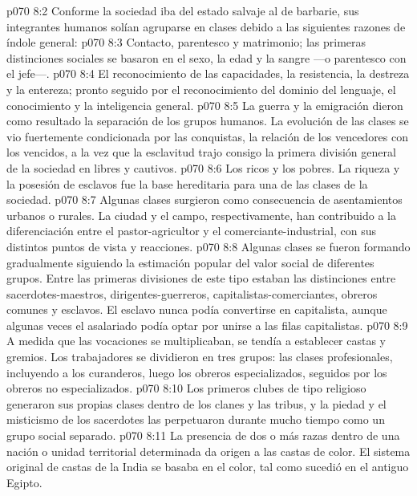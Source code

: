 \vs p070 8:2 Conforme la sociedad iba del estado salvaje al de barbarie, sus integrantes humanos solían agruparse en clases debido a las siguientes razones de índole general:
\vs p070 8:3  Contacto, parentesco y matrimonio; las primeras distinciones sociales se basaron en el sexo, la edad y la sangre ---o parentesco con el jefe---.
\vs p070 8:4  El reconocimiento de las capacidades, la resistencia, la destreza y la entereza; pronto seguido por el reconocimiento del dominio del lenguaje, el conocimiento y la inteligencia general.
\vs p070 8:5  La guerra y la emigración dieron como resultado la separación de los grupos humanos. La evolución de las clases se vio fuertemente condicionada por las conquistas, la relación de los vencedores con los vencidos, a la vez que la esclavitud trajo consigo la primera división general de la sociedad en libres y cautivos.
\vs p070 8:6  Los ricos y los pobres. La riqueza y la posesión de esclavos fue la base hereditaria para una de las clases de la sociedad.
\vs p070 8:7  Algunas clases surgieron como consecuencia de asentamientos urbanos o rurales. La ciudad y el campo, respectivamente, han contribuido a la diferenciación entre el pastor\hyp{}agricultor y el comerciante\hyp{}industrial, con sus distintos puntos de vista y reacciones.
\vs p070 8:8  Algunas clases se fueron formando gradualmente siguiendo la estimación popular del valor social de diferentes grupos. Entre las primeras divisiones de este tipo estaban las distinciones entre sacerdotes\hyp{}maestros, dirigentes\hyp{}guerreros, capitalistas\hyp{}comerciantes, obreros comunes y esclavos. El esclavo nunca podía convertirse en capitalista, aunque algunas veces el asalariado podía optar por unirse a las filas capitalistas.
\vs p070 8:9  A medida que las vocaciones se multiplicaban, se tendía a establecer castas y gremios. Los trabajadores se dividieron en tres grupos: las clases profesionales, incluyendo a los curanderos, luego los obreros especializados, seguidos por los obreros no especializados.
\vs p070 8:10  Los primeros clubes de tipo religioso generaron sus propias clases dentro de los clanes y las tribus, y la piedad y el misticismo de los sacerdotes las perpetuaron durante mucho tiempo como un grupo social separado.
\vs p070 8:11  La presencia de dos o más razas dentro de una nación o unidad territorial determinada da origen a las castas de color. El sistema original de castas de la India se basaba en el color, tal como sucedió en el antiguo Egipto.
